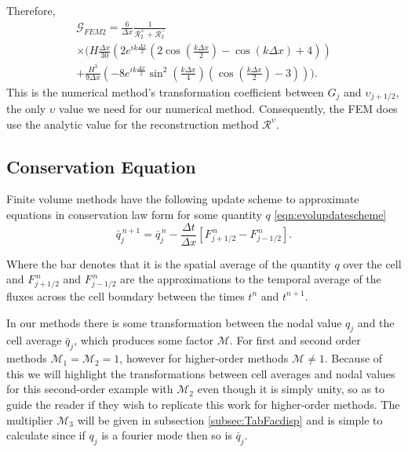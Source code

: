  
Therefore,
  \begin{multline*}
  \mathcal{G}_{FEM2}  = \frac{6}{\Delta x} \frac{1}{\mathcal{R}^+_2 +\mathcal{R}^-_2} \\ \times \Bigg(H\frac{\Delta x}{30} \left(2e^{ik\frac{\Delta x}{2}} \left(2\cos\left(\frac{k \Delta x}{2}\right) - \cos\left({k \Delta x}\right) + 4\right)\right) \\+ \frac{H^3 }{9\Delta x}\left(-8e^{ik\frac{\Delta x}{2}} \sin^2\left(\frac{k \Delta x}{4}\right)\left(\cos\left(\frac{k \Delta x}{2}\right) - 3 \right) \right)   \Bigg).
  \end{multline*}
 This is the numerical method's transformation coefficient between $G_j$ and $\upsilon_{j+1/2}$, the only $\upsilon$ value we need for our numerical method. Consequently, the FEM does use the analytic value for the reconstruction method $\mathcal{R}^\upsilon$.


\subsection{Conservation Equation}
Finite volume methods have the following update scheme to approximate equations in conservation law form for some quantity $q$ \eqref{eqn:evolupdatescheme}
\begin{equation*}
\bar{q}^{\,n + 1}_{j} = \bar{q}^{\,n}_{j} - \frac{\Delta t}{\Delta x} \left[F^{\,n} _{j+1/2} - F^{\,n} _{j-1/2} \right].
\end{equation*}


Where the bar denotes that it is the spatial average of the quantity $q$ over the cell and $F^{\,n} _{j+1/2}$ and $F^{\,n} _{j-1/2}$ are the approximations to the temporal average of the fluxes across the cell boundary between the times $t^n$ and $t^{n+1}$. 

In our methods there is some transformation between the nodal value $q_j$ and the cell average $\bar{q}_j$, which produces some factor $\mathcal{M}$. For first and second order methods $\mathcal{M}_1 = \mathcal{M}_2 = 1$, however for higher-order methods $\mathcal{M} \neq 1$. Because of this we will highlight the transformations between cell averages and nodal values for this second-order example with $\mathcal{M}_2$ even though it is simply unity, so as to guide the reader if they wish to replicate this work for higher-order methods. The multiplier $\mathcal{M}_3$ will be given in subsection \ref{subsec:TabFacdisp} and is simple to calculate since if ${q}_j$ is a fourier mode then so is $\bar{q}_j$.

